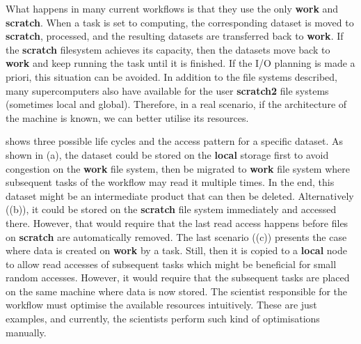 \documentclass[a4paper]{article}
\begin{document}
What happens in many current workflows is that they use the only \textbf{work} and \textbf{scratch}.
When a task is set to computing, the corresponding dataset is moved to \textbf{scratch}, processed, and the resulting datasets are transferred back to \textbf{work}.
If the \textbf{scratch} filesystem achieves its capacity, then the datasets move back to \textbf{work} and keep running the task until it is finished.
If the I/O planning is made a priori, this situation can be avoided.
In addition to the file systems described, many supercomputers also have available for the user \textbf{scratch2} file systems (sometimes local and global).
Therefore, in a real scenario, if the architecture of the machine is known, we can better utilise its resources.

 shows three possible life cycles and the access pattern for a specific dataset.
As shown in (a), the dataset could be stored on the \textbf{local} storage first to avoid congestion on the \textbf{work} file system, then be migrated to \textbf{work} file system where subsequent tasks of the workflow may read it multiple times.
In the end, this dataset might be an intermediate product that can then be deleted.
Alternatively ((b)), it could be stored on the \textbf{scratch} file system immediately and accessed there.
However, that would require that the last read access happens before files on \textbf{scratch} are automatically removed.
The last scenario ((c)) presents the case where data is created on \textbf{work} by a task. Still, then it is copied to a \textbf{local} node to allow read accesses of subsequent tasks which might be beneficial for small random accesses.
However, it would require that the subsequent tasks are placed on the same machine where data is now stored.
The scientist responsible for the workflow must optimise the available resources intuitively.
These are just examples, and currently, the scientists perform such kind of optimisations manually.
\end{document}
